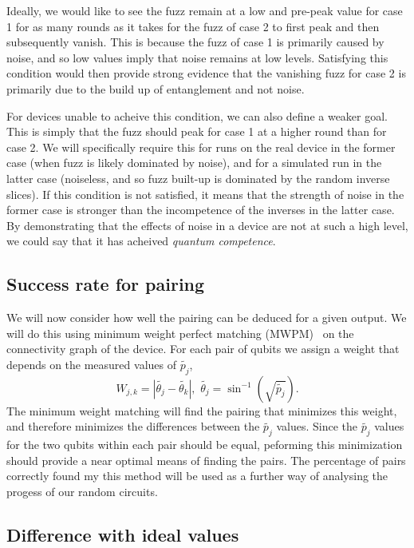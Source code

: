 \documentclass[aps,prl,twocolumn,showpacs,preprintnumbers]{revtex4-1}
\newcommand{\be}{\begin{equation}}
\newcommand{\ee}{\end{equation}}
\begin{document}
Ideally, we would like to see the fuzz remain at a low and pre-peak value for case 1 for as many rounds as it takes for the fuzz of case 2 to first peak and then subsequently vanish. This is because the fuzz of case 1 is primarily caused by noise, and so low values imply that noise remains at low levels. Satisfying this condition would then provide strong evidence that the vanishing fuzz for case 2 is primarily due to the build up of entanglement and not noise.

For devices unable to acheive this condition, we can also define a weaker goal. This is simply that the fuzz should peak for case 1 at a higher round than for case 2. We will specifically require this for runs on the real device in the former case (when fuzz is likely dominated by noise), and for a simulated run in the latter case (noiseless, and so fuzz built-up is dominated by the random inverse slices). If this condition is not satisfied, it means that the strength of noise in the former case is stronger than the incompetence of the inverses in the latter case. By demonstrating that the effects of noise in a device are not at such a high level, we could say that it has acheived \textit{quantum competence}.

\subsection{Success rate for pairing}

We will now consider how well the pairing can be deduced for a given output. We will do this using minimum weight perfect matching (MWPM)~\cite{edmonds:65,rantwijk} on the connectivity graph of the device. For each pair of qubits we assign a weight that depends on the measured values of $\tilde{p_j}$,
\be \label{angle}
W_{j,k} = | \tilde{\theta_j} - \tilde{\theta_k} |, \,\, \tilde{\theta_j} = \sin^{-1}( \sqrt{\tilde{p_j}} ).
\ee
The minimum weight matching will find the pairing that minimizes this weight, and therefore minimizes the differences between the $\tilde{p_j}$ values. Since the $\tilde{p_j}$ values for the two qubits within each pair should be equal, peforming this minimization should provide a near optimal means of finding the pairs. The percentage of pairs correctly found my this method will be used as a further way of analysing the progess of our random circuits.

\subsection{Difference with ideal values}
\end{document}
